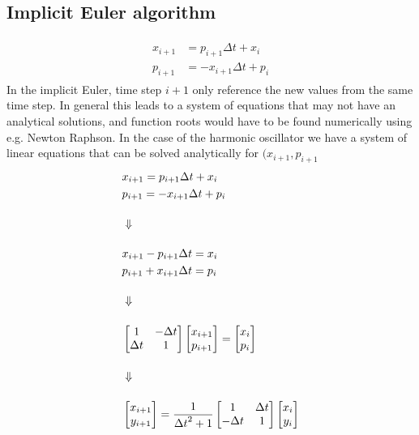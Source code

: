 \subsection{Implicit Euler algorithm}
\begin{align}
\begin{split}
x_{i+1} &= p_{i+1}\Delta t + x_i \\
p_{i+1} &= -x_{i+1}\Delta t + p_i
\end{split}
\end{align}
In the implicit Euler, time step $i+1$ only reference the new values from the same time step. In general this leads to a system of equations that may not have an analytical solutions, and function roots would have to be found numerically using e.g. Newton Raphson. In the case of the harmonic oscillator we have a system of linear equations that can be solved analytically for $(x_{i+1},p_{i+1}$
\begin{align}
\notag &x_{i+1} = p_{i+1}\Delta t + x_i \\
\notag &p_{i+1} = -x_{i+1}\Delta t + p_i \\[0.4cm]
\notag & \Downarrow \\[0.4cm]
\notag &x_{i+1} - p_{i+1}\Delta t = x_i \\
\notag &p_{i+1} + x_{i+1}\Delta t = p_i \\[0.4cm]
\notag &\Downarrow \\[0.4cm]
\notag &\begin{bmatrix}
  1 & -\Delta t \\
  \Delta t & 1
\end{bmatrix}
\begin{bmatrix}
  x_{i+1} \\
  p_{i+1}
\end{bmatrix}
= \begin{bmatrix}
  x_i \\
  p_i
\end{bmatrix} \\[0.4cm]
\notag &\Downarrow \\[0.4cm]
&\begin{bmatrix} \label{al:ho-euler_i}
  x_{i+1} \\
  y_{i+1}
\end{bmatrix}
= \dfrac{1}{{\Delta t}^2 + 1}
\begin{bmatrix}
  1 & \Delta t \\
  -\Delta t & 1
\end{bmatrix}
\begin{bmatrix}
  x_i \\
  y_i
\end{bmatrix}
\end{align}

